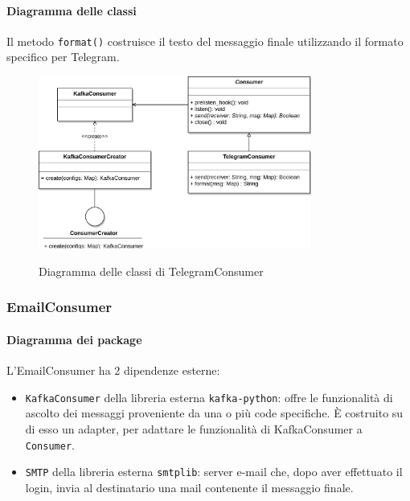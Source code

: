 \paragraph{Diagramma delle classi}

Il metodo \texttt{format()} costruisce il testo del messaggio finale utilizzando il formato  specifico per Telegram.

\begin{figure}[H]
    \centering
    \includegraphics[width=0.8\textwidth]{img/Consumers-TelegramConsumer.png}\\
    \caption{Diagramma delle classi di TelegramConsumer}
\end{figure}


\subsubsection{EmailConsumer}

\paragraph{Diagramma dei package}

L'EmailConsumer ha 2 dipendenze esterne:
\begin{itemize}
    \item \texttt{KafkaConsumer} della libreria esterna \texttt{kafka-python}: offre le funzionalità di ascolto dei messaggi
        proveniente da una o più code specifiche. È costruito su di esso un adapter, per adattare le funzionalità di KafkaConsumer a
        \texttt{Consumer}.
    \item \texttt{SMTP} della libreria esterna \texttt{smtplib}: server e-mail che, dopo aver effettuato il login,
        invia al destinatario una mail contenente il messaggio finale.
\end{itemize}

